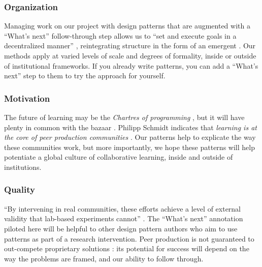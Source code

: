 \endgroup

\vspace{-.25\baselineskip}

\subsubsection*{Organization} 
Managing work on our project with design patterns that are augmented
with a ``What's next'' follow-through step allows us to ``set and execute goals in a decentralized manner'' \cite{benkler2015peer}, reintegrating
structure in the form of an emergent .  Our
methods apply at varied levels of scale and degrees of formality,
inside or outside of institutional frameworks.  If you already write
patterns, you can add a ``What's next'' step to them to try the
approach for yourself.

\vspace{-.25\baselineskip}

\subsubsection*{Motivation}  The future of learning may be
the \emph{Chartres of programming} \cite{alexander1999origins}, but it will have plenty in common with the
bazaar \cite{raymond2001cathedral}.
%
Philipp Schmidt indicates that \emph{learning is at the core of peer
  production communities} \cite{schmidt+commons-based+2009}.  Our
patterns help to explicate the way these communities work, but more
importantly, we hope these patterns will help potentiate a global
culture of collaborative learning, inside and outside of institutions.

\vspace{-.25\baselineskip}

\subsubsection*{Quality} 
``By intervening in real communities, these efforts achieve a level of
external validity that lab-based experiments cannot''
\cite{benkler2015peer}.  The ``What's next'' annotation piloted here
will be helpful to other design pattern authors who aim to use
patterns as part of a research intervention.  Peer production is not guaranteed to
  out-compete proprietary solutions
\cite{benkler2015peer,free-software-better}: its potential for
success will depend on the way the problems are framed,
and our ability to follow through.

